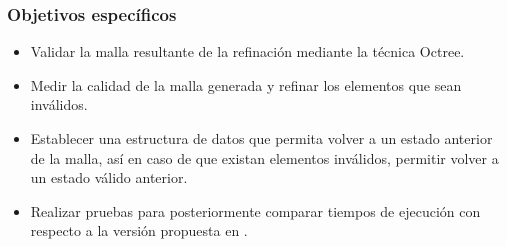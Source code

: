 \subsubsection{Objetivos específicos}
\begin{itemize}
    \item Validar la malla resultante de la refinación mediante la técnica Octree.
    \item Medir la calidad de la malla generada y refinar los elementos que sean inválidos.
    \item Establecer una estructura de datos que permita volver a un estado anterior de la malla, así en caso de que existan elementos inválidos, permitir volver a un estado válido anterior.
    \item Realizar pruebas para posteriormente comparar tiempos de ejecución con respecto a la versión propuesta en \cite{daines2018repairing}.
\end{itemize}

